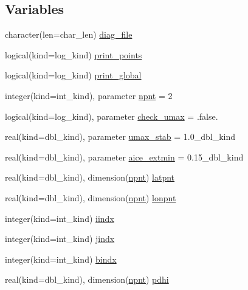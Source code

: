 \subsection*{Variables}
\begin{DoxyCompactItemize}
\item 
character(len=char\_\-len) \hyperlink{namespaceice__diagnostics_a0a7c9100fd06a3512e3f27d229758d8c}{diag\_\-file}
\item 
logical(kind=log\_\-kind) \hyperlink{namespaceice__diagnostics_a673176ef3ac5261be4052bc66ecec3cf}{print\_\-points}
\item 
logical(kind=log\_\-kind) \hyperlink{namespaceice__diagnostics_a0f58339d06d864451082d8805eaa03b1}{print\_\-global}
\item 
integer(kind=int\_\-kind), parameter \hyperlink{namespaceice__diagnostics_aab9ed37bb736e9c83d4bf276c8010dc2}{npnt} = 2
\item 
logical(kind=log\_\-kind), parameter \hyperlink{namespaceice__diagnostics_a2a08d0704bb691e6ffeaec5bd6d8cbc4}{check\_\-umax} = .false.
\item 
real(kind=dbl\_\-kind), parameter \hyperlink{namespaceice__diagnostics_aa1bd3bdd9f09aa609191984ea21310c9}{umax\_\-stab} = 1.0\_\-dbl\_\-kind
\item 
real(kind=dbl\_\-kind), parameter \hyperlink{namespaceice__diagnostics_aabe1b0ea631c03eded45a36cdd99fd21}{aice\_\-extmin} = 0.15\_\-dbl\_\-kind
\item 
real(kind=dbl\_\-kind), dimension(\hyperlink{namespaceice__diagnostics_aab9ed37bb736e9c83d4bf276c8010dc2}{npnt}) \hyperlink{namespaceice__diagnostics_a098c8da869ccfcbbd1ed9aea5124ee59}{latpnt}
\item 
real(kind=dbl\_\-kind), dimension(\hyperlink{namespaceice__diagnostics_aab9ed37bb736e9c83d4bf276c8010dc2}{npnt}) \hyperlink{namespaceice__diagnostics_ac674492c3212f73e6ab2a93e41774c0b}{lonpnt}
\item 
integer(kind=int\_\-kind) \hyperlink{namespaceice__diagnostics_a1a0b626616a7d9a32101d00161d2b574}{iindx}
\item 
integer(kind=int\_\-kind) \hyperlink{namespaceice__diagnostics_ae14da62eafd352886088d4688a3a2129}{jindx}
\item 
integer(kind=int\_\-kind) \hyperlink{namespaceice__diagnostics_a531e9ef9082091f153db74c9a1816c12}{bindx}
\item 
real(kind=dbl\_\-kind), dimension(\hyperlink{namespaceice__diagnostics_aab9ed37bb736e9c83d4bf276c8010dc2}{npnt}) \hyperlink{namespaceice__diagnostics_ae9176a1e4ff6d526241dfbc185fef462}{pdhi}

\end{DoxyCompactItemize}
